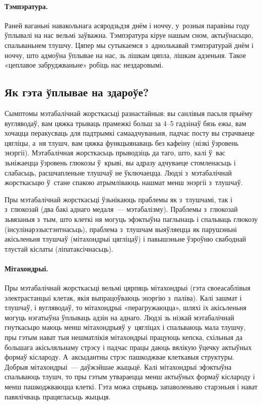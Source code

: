 
\paragraph{Тэмпэратура.}
Раней ваганьні навакольнага асяродзьдзя днём і ноччу, у~розныя паравіны году ўплывалі на нас вельмі заўважна. Тэмпэратура кіруе нашым сном, актыўнасьцю, спальваньнем тлушчу. Цяпер мы сутыкаемся з~аднолькавай тэмпэратурай днём і ноччу, што адмоўна ўплывае на нас, зь лішкам цяпла, лішкам адзеньня. Такое «цеплавое забруджваньне» робіць нас нездаровымі.

\subsection{Як гэта ўплывае на здароўе?}

Сымптомы мэтабалічнай жорсткасьці разнастайныя: вы санлівыя пасьля прыёму вугляводаў, вам цяжка трываць прамежкі больш за 4--5 гадзінаў бязь ежы, вам хочацца перакусваць для падтрымкі самаадчуваньня, падчас посту вы страчваеце цягліцы, а~ня тлушч, вам цяжка функцыянаваць без кафеіну (нізкі ўзровень энэргіі). Мэтабалічная жорсткасьць прыводзіць да таго, што, калі ў~вас зьніжаецца ўзровень глюкозы ў~крыві, вы адразу адчуваеце стомленасьць і слабасьць, расшчапленьне тлушчаў не ўключаецца. Людзі з~мэтабалічнай жорсткасьцю ў~стане спакою атрымліваюць нашмат менш энэргіі з~тлушчаў.

Пры мэтабалічнай жорсткасьці ўзьнікаюць праблемы як з~тлушчамі, так і з~глюкозай (два бакі аднаго медаля~--- мэтабалізму). Праблемы з~глюкозай зьвязаныя з~тым, што клеткі ня могуць эфэктыўна паглынаць і спальваць глюкозу (інсулінарэзыстэнтнасьць), праблема з~тлушчам выяўляецца як парушэньні акісьленьня тлушчаў (мітахондрыі цягліцаў) і павышэньне ўзроўню свабоднай тлустай кіслаты (ліпатаксічнасьць).

\paragraph{Мітахондрыі.}
Пры мэтабалічнай жорсткасьці вельмі цярпяць мітахондрыі (гэта своеасаблівыя электрастанцыі клетак, якія выпрацоўваюць энэргію з~паліва). Калі зашмат і тлушчаў, і вугляводаў, то мітахондрыі «перагружаюцца», шляхі іх акісьленьня могуць нэгатыўна ўплываць адзін на аднаго. Людзі зь нізкай мэтабалічнай гнуткасьцю маюць менш мітахондрыяў у~цягліцах і спальваюць мала тлушчу, пры гэтым нават тыя нешматлікія мітахондрыі працуюць кепска, схільныя да большага акісьляльнаму стрэсу і падчас працы даюць вялікую ўцечку актыўных формаў кіслароду. А~аксыдантны стрэс пашкоджвае клеткавыя структуры. Добрыя мітахондрыі~--- даўжэйшае жыцьцё. Калі мітахондрыі эфэктыўна спальваюць тлушч, то пры гэтым утвараецца менш актыўных формаў кіслароду і менш пашкоджваюцца клеткі. Гэта можа спрыяць запаволеньню старэньня і нават павялічваць працягласьць жыцьця.

